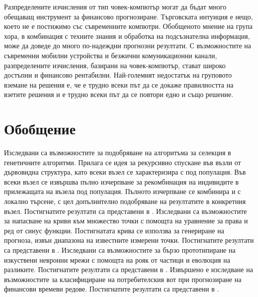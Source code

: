 Разпределените изчисления от тип човек-компютър могат да бъдат много обещаващ инструмент за финансово прогнозиране. Търговската интуиция е нещо, което не е постижимо със съвременните компютри. Обобщеното мнение на група хора, в комбинация с техните знания и обработка на подсъзнателна информация, може да доведе до много по-надеждни прогнозни резултати. С възможностите на съвременни мобилни устройства и безжични комуникационни канали, разпределените изчисления, базирани на човек-компютър, стават широко достъпни и финансово рентабилни. Най-големият недостатък на груповото вземане на решения е, че е трудно всеки път да се докаже правилността на взетите решения и е трудно всеки път да се повтори едно и също решение.

\section{Обобщение}

Изследвани са възможностите за подобряване на алгоритъма за селекция в генетичните алгоритми. Прилага се идея за рекурсивно спускане във възли от дървовидна структура, като всеки възел се характеризира с под популация. Във всеки възел се извършва пълно изчерпване за рекомбинация на индивидите в прилежащата на възела под популация. Пълното изчерпване се комбинира и с локално търсене, с цел допълнително подобряване на резултатите в конкретния възел. Постигнатите резултати са представени в \cite{Tomov-01,Tomov-02}. Изследвани са възможностите за напасване на криви към множество точки с помощта на уравнение за права и ред от синус функции. Постигнатата крива се използва за генериране на прогноза, извън диапазона на известните измерени точки. Постигнатите резултати са представени в \cite{Velichkova-01}. Изследвани са възможностите за бързо прототипиране на изкуствени невронни мрежи с помощта на рояк от частици и еволюция на разликите.  Постигнатите резултати са представени в \cite{Tomov-04}. Извършено е изследване на възможностите за класифициране на потребителския вот при прогнозиране на финансови времеви редове. Постигнатите резултати са представени в \cite{Tomov-03}.

